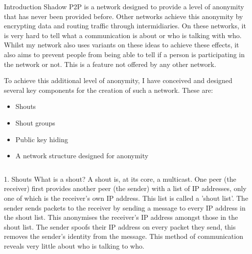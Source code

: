 \documentclass[ %
                    author={Luke Murray},
                supervisor={Dr. Simon Hollis},
                     title={Shadow Peer-to-Peer Networks},
                  subtitle={},
                    degree={MEng},
                      year={2013} ]{poster}
\begin{document}

\begin{frame}{} 

\vfill

\begin{columns}[t]
    \begin{column}{0.900\linewidth}
    \begin{block}{\normalsize Introduction}
    \small Shadow P2P is a network designed to provide a level of anonymity that has never been provided before. Other networks achieve this anonymity by encrypting data and routing traffic through intermidiaries. On these networks, it is very hard to tell what a communication is about or who is talking with who. Whilst my network also uses variants on these ideas to achieve these effects, it also aims to prevent people from being able to tell if a person is participating in the network or not. This is a feature not offered by any other network.
    
    To achieve this additional level of anonymity, I have conceived and designed several key components for the creation of such a network. These are:
    \begin{itemize}
    \item Shouts
    \item Shout groups
    \item Public key hiding
    \item A network structure designed for anonymity
    \end{itemize}
    \end{block}
    \end{column}
\end{columns}

\vfill

\begin{columns}[t]
    \begin{column}{0.422\linewidth}
    \begin{block}{\normalsize 1. Shouts}
    \small What is a shout? A shout is, at its core, a multicast. One peer (the receiver) first provides another peer (the sender) with a list of IP addresses, only one of which is the receiver's own IP address. This list is called a 'shout list'. The sender sends packets to the receiver by sending a message to every IP address in the shout list. This anonymises the receiver's IP address amongst those in the shout list. The sender spoofs their IP address on every packet they send, this removes the sender's identity from the message. This method of communication reveals very little about who is talking to who.


\end{block}
\end{column}
\end{columns}
\end{frame}
\end{document}

